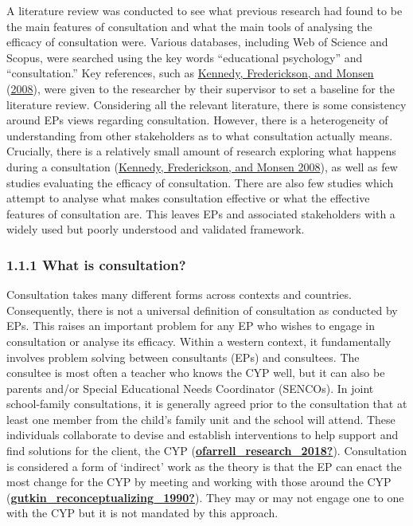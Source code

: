 \documentclass[
]{article}
\begin{document}
A literature review was conducted to see what previous research had
found to be the main features of consultation and what the main tools of
analysing the efficacy of consultation were. Various databases,
including Web of Science and Scopus, were searched using the key words
``educational psychology'' and ``consultation.'' Key references, such as
\protect\hyperlink{ref-kennedyEducationalPsychologistsWalk2008}{Kennedy,
Frederickson, and Monsen}
(\protect\hyperlink{ref-kennedyEducationalPsychologistsWalk2008}{2008}),
were given to the researcher by their supervisor to set a baseline for
the literature review. Considering all the relevant literature, there is
some consistency around EPs views regarding consultation. However, there
is a heterogeneity of understanding from other stakeholders as to what
consultation actually means. Crucially, there is a relatively small
amount of research exploring what happens during a consultation
(\protect\hyperlink{ref-kennedyEducationalPsychologistsWalk2008}{Kennedy,
Frederickson, and Monsen 2008}), as well as few studies evaluating the
efficacy of consultation. There are also few studies which attempt to
analyse what makes consultation effective or what the effective features
of consultation are. This leaves EPs and associated stakeholders with a
widely used but poorly understood and validated framework.

\hypertarget{what-is-consultation}{%
\subsubsection{1.1.1 What is consultation?}\label{what-is-consultation}}

Consultation takes many different forms across contexts and countries.
Consequently, there is not a universal definition of consultation as
conducted by EPs. This raises an important problem for any EP who wishes
to engage in consultation or analyse its efficacy. Within a western
context, it fundamentally involves problem solving between consultants
(EPs) and consultees. The consultee is most often a teacher who knows
the CYP well, but it can also be parents and/or Special Educational
Needs Coordinator (SENCOs). In joint school-family consultations, it is
generally agreed prior to the consultation that at least one member from
the child's family unit and the school will attend. These individuals
collaborate to devise and establish interventions to help support and
find solutions for the client, the CYP
(\protect\hyperlink{ref-ofarrell_research_2018}{\textbf{ofarrell\_research\_2018?}}).
Consultation is considered a form of `indirect' work as the theory is
that the EP can enact the most change for the CYP by meeting and working
with those around the CYP
(\protect\hyperlink{ref-gutkin_reconceptualizing_1990}{\textbf{gutkin\_reconceptualizing\_1990?}}).
They may or may not engage one to one with the CYP but it is not
mandated by this approach.
\end{document}
